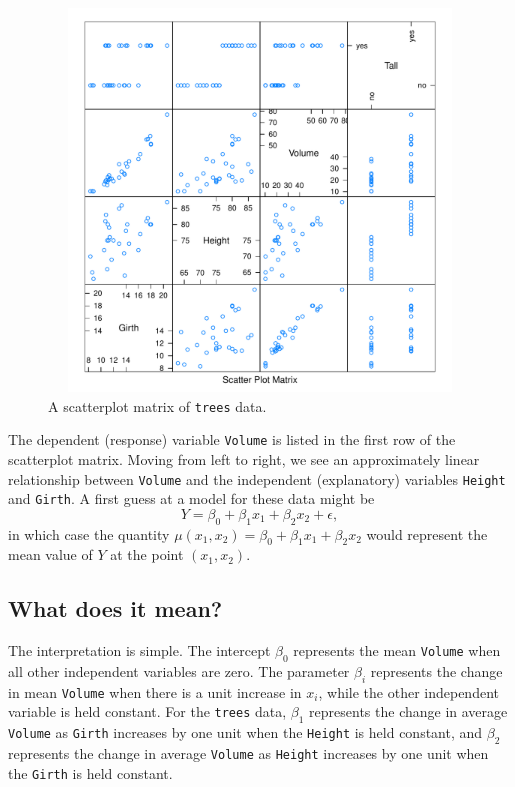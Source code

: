 \documentclass[captions=tableheading]{scrbook}
\begin{document}
\begin{example}
\begin{figure}[ht!]
    \includegraphics[width=5in, height=4in]{img/splom-trees.pdf}
    \caption[Scatterplot matrix of \texttt{trees} data]{\small A scatterplot matrix of \texttt{trees} data.}
    \label{fig:splom-trees}
  \end{figure}

The dependent (response) variable \texttt{Volume} is listed in the first row of the scatterplot matrix. Moving from left to right, we see an approximately linear relationship between \texttt{Volume} and the independent (explanatory) variables \texttt{Height} and \texttt{Girth}. A first guess at a model for these data might be
\begin{equation}
Y=\beta_{0}+\beta_{1}x_{1}+\beta_{2}x_{2}+\epsilon,
\end{equation}
in which case the quantity $\mu(x_{1},x_{2})=\beta_{0}+\beta_{1}x_{1}+\beta_{2}x_{2}$ would represent the mean value of $Y$ at the point $(x_{1},x_{2})$.
\end{example}
\subsection{What does it mean?}
\label{sec-1-1-1}


The interpretation is simple. The intercept $\beta_{0}$ represents the mean \texttt{Volume} when all other independent variables are zero. The parameter $\beta_{i}$ represents the change in mean \texttt{Volume} when there is a unit increase in $x_{i}$, while the other independent variable is held constant. For the \texttt{trees} data, $\beta_{1}$ represents the change in average \texttt{Volume} as \texttt{Girth} increases by one unit when the \texttt{Height} is held constant, and $\beta_{2}$ represents the change in average \texttt{Volume} as \texttt{Height} increases by one unit when the \texttt{Girth} is held constant. 
\end{document}
